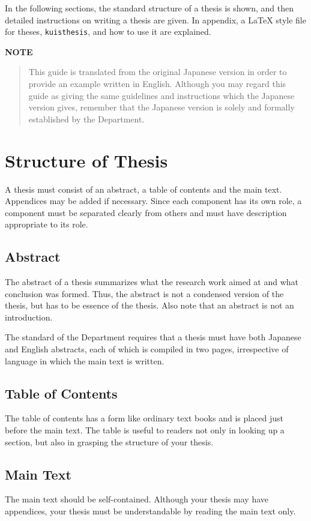 \documentclass[master,english]{kuisthesis}
\begin{document}
In the following sections, the standard structure of a thesis is shown, and
then detailed instructions on writing a thesis are given.  In appendix, a
\LaTeX{} style file for theses, \verb|kuisthesis|, and how to use it are
explained.

\par\bigskip\centerline{\bf NOTE}
\begin{quote}
  This guide is translated from the original Japanese version in order
  to provide an example written in English.  Although you may regard
  this guide as giving the same guidelines and instructions which the
  Japanese version gives, remember that the Japanese version is solely
  and formally established by the Department.
\end{quote}

\section{Structure of Thesis}\label{sec-structure}
A thesis must consist of an abstract, a table of contents and the main text.
Appendices may be added if necessary.  Since each component has its own role,
a component must be separated clearly from others and must have description
appropriate to its role.

\subsection{Abstract}\label{subsec-abstract}
The abstract of a thesis summarizes what the research work aimed at and what
conclusion was formed.  Thus, the abstract is not a condensed version of the
thesis, but has to be essence of the thesis.  Also note that an abstract
is not an introduction.

The standard of the Department requires that a thesis must have both
Japanese and English abstracts, each of which is compiled in two pages,
irrespective of language in which the main text is written.

\subsection{Table of Contents}\label{subsec-toc}
The table of contents has a form like ordinary text books and is placed just
before the main text.  The table is useful to readers not only in looking up
a section, but also in grasping the structure of your thesis.

\subsection{Main Text}\label{subsec-main}
The main text should be self-contained.  Although your thesis may have
appendices, your thesis must be understandable by reading the main text
only.
\end{document}
